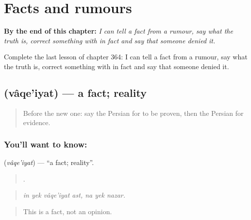 
\chapter{Facts and rumours}
\label{ch:fa-facts-and-rumours}

\begin{chapteropening}
\textbf{By the end of this chapter:} \emph{I can tell a fact from a rumour, say what the truth is, correct something with in fact and say that someone denied it.}

Complete the last lesson of chapter 364: I can tell a fact from a rumour, say what the truth is, correct something with in fact and say that someone denied it.
\end{chapteropening}

\section[\texorpdfstring{\fa{واقعیت} (vâqe'iyat)}{واقعیت (vâqe'iyat)}]{ (vâqe'iyat) — a fact; reality}

\label{lesson:FA-C364-vaqeiyyat}



\begin{quote}
Before the new one: say the Persian for to be proven, then the Persian for evidence.
\end{quote}

\subsection*{You'll want to know: }
\textbf{} (\emph{vâqe'iyat}) — \textquotedblleft{}a fact; reality\textquotedblright{}.

\begin{quote}
      .
\end{quote}

\begin{quote}
\emph{in yek vâqe'iyat ast, na yek nazar.}
\end{quote}

\begin{quote}
This is a fact, not an opinion.
\end{quote}


